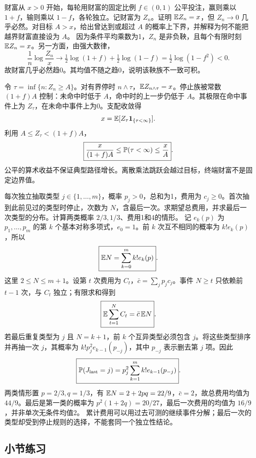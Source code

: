财富从 $x>0$ 开始，每轮用财富的固定比例 $f\in(0,1)$ 公平投注，赢则乘以 $1+f$，输则乘以 $1-f$，各轮独立。记财富为 $Z_n$。证明 $\mathbb{E} Z_n=x$，但 $Z_n\to0$ 几乎必然。对目标 $A>x$，给出曾达到或超过 $A$ 的概率上下界，并解释为何不能把越界财富直接设为 $A$。
\solution 因为条件平均乘数为1，$Z_n$ 是非负鞅，且每个有限时刻 $\mathbb{E} Z_n=x$。另一方面，由强大数律，
\[
 \frac1n\log\frac{Z_n}{x}\longrightarrow
 \tfrac12\log(1+f)+\tfrac12\log(1-f)
 =\tfrac12\log(1-f^2)<0.
\]
故财富几乎必然趋0。其均值不随之趋0，说明该鞅族不一致可积。

令 $\tau=\inf\{n:Z_n\ge A\}$。对有界停时 $n\wedge\tau$，$\mathbb{E} Z_{n\wedge\tau}=x$。停止族被常数 $(1+f)A$ 控制：未命中时低于 $A$，命中时的上一步仍低于 $A$。其极限在命中事件上为 $Z_\tau$，在未命中事件上为0。支配收敛得
\[
 x=\mathbb{E}[Z_\tau\mathbf{1}_{\{\tau<\infty\}}].
\]
利用 $A\le Z_\tau<(1+f)A$，
\[
 \boxed{\frac{x}{(1+f)A}\le\mathbb{P}(\tau<\infty)\le\frac xA}.
\]
\insight 公平的算术收益不保证典型路径增长。离散乘法跳跃会越过目标，终端财富不是固定边界值。

每次独立抽取类型 $j\in\{1,\ldots,m\}$，概率 $p_j>0$，总和为1，费用为 $c_j\ge0$。首次抽到此前见过的类型时停止，次数为 $N$，含最后一次。求期望总费用，并求最后一次类型的分布。计算两类概率 $2/3,1/3$、费用1和4的情形。
\solution 记 $e_k(p)$ 为 $p_1,\ldots,p_m$ 的第 $k$ 个基本对称多项式，$e_0=1$。前 $k$ 次互不相同的概率为 $k!e_k(p)$，所以
\[
 \boxed{\mathbb{E} N=\sum_{k=0}^m k!e_k(p)}.
\]
这里 $2\le N\le m+1$。设第 $t$ 次费用为 $C_t$，$\bar c=\sum_jp_jc_j$。事件 $N\ge t$ 只依赖前 $t-1$ 次，与 $C_t$ 独立；有限求和得到
\[
 \boxed{\mathbb{E}\sum_{t=1}^N C_t=\bar c\,\mathbb{E} N}.
\]
若最后重复类型为 $j$ 且 $N=k+1$，前 $k$ 个互异类型必须包含 $j$。将这些类型排序并再抽一次 $j$，其概率为 $k!p_j^2e_{k-1}(p_{-j})$，其中 $p_{-j}$ 表示删去第 $j$ 项。因此
\[
 \boxed{\mathbb{P}(J_{\rm last}=j)=p_j^2\sum_{k=1}^m k!e_{k-1}(p_{-j})}.
\]
两类情形置 $p=2/3,q=1/3$，有 $\mathbb{E} N=2+2pq=22/9$，$\bar c=2$，故总费用均值为 $\boxed{44/9}$。最后是第一类的概率为 $p^2(1+2q)=20/27$，最后一次费用的均值为 $\boxed{16/9}$，并非单次无条件均值2。
\insight 累计费用可以用过去可测的继续事件分解；最后一次的类型却受到停止规则的选择，不能套同一个独立性结论。

\par{}
\subsection*{小节练习}



